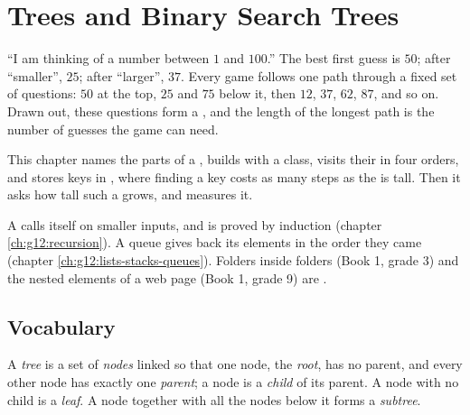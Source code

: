 \chapter{Trees and Binary Search Trees}\label{ch:g12:trees}

``I am thinking of a number between $1$ and $100$.'' The best first guess is $50$; after ``smaller'', $25$; after
``larger'', $37$. Every game follows one path through a fixed set of questions: $50$ at the top, $25$ and $75$ below
it, then $12$, $37$, $62$, $87$, and so on. Drawn out, these questions form a , and the length of the longest
path is the number of guesses the game can need.

This chapter names the parts of a , builds  with a class, visits their  in four orders, and
stores keys in , where finding a key costs as many steps as the  is tall. Then it asks how
tall such a  grows, and measures it.

\begin{recall}
A  calls itself on smaller inputs, and is proved by induction (chapter \ref{ch:g12:recursion}). A
queue gives back its elements in the order they came (chapter \ref{ch:g12:lists-stacks-queues}). Folders inside
folders (Book 1, grade 3) and the nested elements of a web page (Book 1, grade 9) are .
\end{recall}

\section{Vocabulary}\label{sec:g12:trees:vocabulary}

\begin{definition}\label{def:g12:trees:tree}
A \emph{tree} is a set of \emph{nodes} linked so that one node, the
\emph{root}, has no parent, and every other node has exactly one \emph{parent}; a node is a
\emph{child} of its parent. A node with no child is a \emph{leaf}. A node together with all
the nodes below it forms a \emph{subtree}.
\end{definition}

